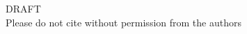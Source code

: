 \documentclass[a4paper,12pt]{article}
\begin{document}
\color{lightgray}

\vspace*{\fill}

\begin{center}
	\begin{turn}{40}
		\begin{minipage}{12cm}
			\centering
			{\fontsize{100}{120}\selectfont DRAFT} \\

			Please do not cite without permission from the authors
		\end{minipage}
	\end{turn}
\end{center}

\vspace*{\fill}
\end{document}
